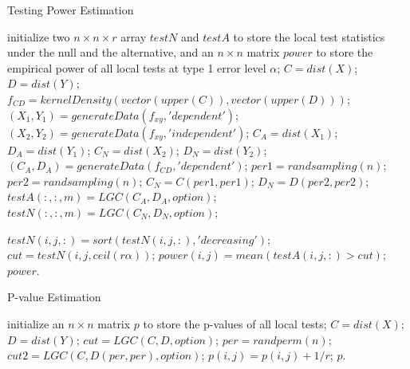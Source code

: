 \documentclass[11pt]{article}
\begin{document}
\begin{algorithm}
\caption{Testing Power Estimation}
\label{algPower}
\begin{algorithmic}
\State initialize two $n \times n \times r$ array $testN$ and $testA$ to store the local test statistics under the null and the alternative, and an $n \times n$ matrix $power$ to store the empirical power of all local tests at type 1 error level $\alpha$;
\State $C=dist(X)$; $D=dist(Y)$;
\State $f_{CD}=kernelDensity(vector(upper(C)),vector(upper(D)))$; 
\EndIf
{} 
\State $(X_{1},Y_{1})=generateData(f_{xy},'dependent')$; 
\State $(X_{2},Y_{2})=generateData(f_{xy},'independent')$; 
\State $C_{A}=dist(X_{1})$; $D_{A}=dist(Y_{1})$; 
\State $C_{N}=dist(X_{2})$; $D_{N}=dist(Y_{2})$; 
\Else
\State $(C_{A},D_{A})=generateData(f_{CD},'dependent')$; 
\State $per1=randsampling(n)$; $per2=randsampling(n)$; 
\State $C_{N}=C(per1,per1)$; $D_{N}=D(per2,per2)$; 
\EndIf
\State $testA(:,:,m)=LGC(C_{A},D_{A},option)$; 
\State $testN(:,:,m)=LGC(C_{N},D_{N},option)$;
\EndFor

\State $testN(i,j,:)=sort(testN(i,j,:),'decreasing')$; 
\State $cut=testN(i,j,ceil(r\alpha))$; 
\State $power(i,j)=mean(testA(i,j,:)>cut)$; 
\EndFor
\EndFor
\State \Return $power$.
\EndFunction
\end{algorithmic}
\end{algorithm}

\begin{algorithm}
\caption{P-value Estimation}
\label{algPerm}
\begin{algorithmic}
\State initialize an $n \times n$ matrix $p$ to store the p-values of all local tests;
\State $C=dist(X)$; $D=dist(Y)$; 
\State $cut=LGC(C,D,option)$; 
\State $per=randperm(n)$; 
\State $cut2=LGC(C,D(per,per),option)$; 
\State $p(i,j)=p(i,j)+1/r$;
\EndIf
\EndFor
\EndFor
\EndFor
\State \Return $p$.
\EndFunction
\end{algorithmic}
\end{algorithm}
\end{document}
